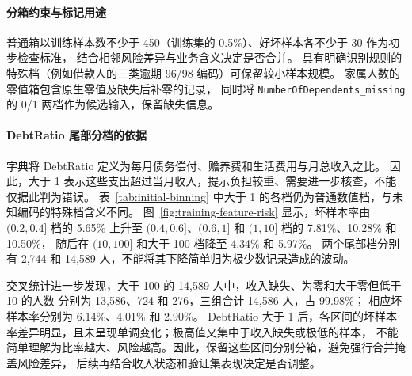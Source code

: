 \paragraph{分箱约束与标记用途}
普通箱以训练样本数不少于 450（训练集的 0.5\%）、好坏样本各不少于 30 作为初步检查标准，
结合相邻风险差异与业务含义决定是否合并。
具有明确识别规则的特殊档（例如借款人的三类逾期 96/98 编码）可保留较小样本规模。
家属人数的零值箱包含原生零值及缺失后补零的记录，
同时将 \texttt{NumberOfDependents\_missing} 的 0/1 两档作为候选输入，保留缺失信息。

\paragraph{DebtRatio 尾部分档的依据}
字典将 DebtRatio 定义为每月债务偿付、赡养费和生活费用与月总收入之比。
因此，大于 1 表示这些支出超过当月收入，提示负担较重、需要进一步核查，不能仅据此判为错误。
表~\ref{tab:initial-binning} 中大于 1 的各档仍为普通数值档，与未知编码的特殊档含义不同。
图~\ref{fig:training-feature-risk} 显示，坏样本率由 $(0.2,0.4]$ 档的 5.65\%
上升至 $(0.4,0.6]$、$(0.6,1]$ 和 $(1,10]$ 档的 7.81\%、10.28\% 和 10.50\%，
随后在 $(10,100]$ 和大于 100 档降至 4.34\% 和 5.97\%。
两个尾部档分别有 2,744 和 14,589 人，不能将其下降简单归为极少数记录造成的波动。

交叉统计进一步发现，大于 100 的 14,589 人中，收入缺失、为零和大于零但低于 10 的人数
分别为 13,586、724 和 276，三组合计 14,586 人，占 99.98\%；
相应坏样本率分别为 6.14\%、4.01\% 和 2.90\%。
DebtRatio 大于 1 后，各区间的坏样本率差异明显，且未呈现单调变化；极高值又集中于收入缺失或极低的样本，
不能简单理解为比率越大、风险越高。因此，保留这些区间分别分箱，避免强行合并掩盖风险差异，
后续再结合收入状态和验证集表现决定是否调整。
